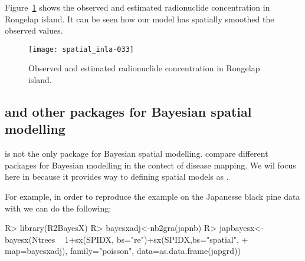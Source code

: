 \documentclass[article]{jss}
\begin{document}


\begin{Schunk}
\end{Schunk}



Figure~\ref{fig:geos} shows the observed and estimated radionuclide
concentration in Rongelap island. It can be seen how our model has spatially
smoothed the observed values.

\begin{figure}[h]
\begin{center}
\texttt{[image: spatial\_inla-033]}
\caption{Observed  and estimated radionuclide concentration
in Rongelap island.}
\label{fig:geos}
\end{center}
\end{figure}

\subsection[{R-INLA} and other packages for Bayesian spatial modelling]{ and other packages for Bayesian spatial modelling}

 is not the only package for Bayesian spatial modelling.
\citet[Chapter 10]{Bivandetal:2013} compare different packages for Bayesian
modelling in the contect of disease mapping. We wil focus here in 
because it provides way to defining spatial models as
.


For example, in order to reproduce the example on the Japanesse black pine
data with  we can do the following:

\begin{Schunk}
\begin{Sinput}
R> library(R2BayesX)
R> bayesxadj<-nb2gra(japnb)
R> japbayesx<-bayesx(Ntrees ~ 1+sx(SPIDX, bs="re")+sx(SPIDX,bs="spatial", 
+     map=bayesxadj), family="poisson", data=as.data.frame(japgrd))
\end{Sinput}
\end{Schunk}
\end{document}
